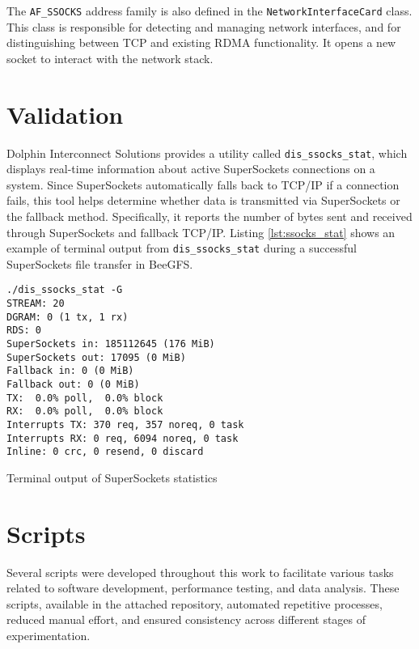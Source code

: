 The \texttt{AF\_SSOCKS} address family is also defined in the \texttt{NetworkInterfaceCard} class. This class is responsible for detecting and managing network interfaces, and for distinguishing between TCP and existing RDMA functionality. It opens a new socket to interact with the network stack.

\section{Validation}

Dolphin Interconnect Solutions provides a utility called \texttt{dis\_ssocks\_stat}, which displays real-time information about active SuperSockets connections on a system. Since SuperSockets automatically falls back to TCP/IP if a connection fails, this tool helps determine whether data is transmitted via SuperSockets or the fallback method. Specifically, it reports the number of bytes sent and received through SuperSockets and fallback TCP/IP. Listing \ref{lst:ssocks_stat} shows an example of terminal output from \texttt{dis\_ssocks\_stat} during a successful SuperSockets file transfer in BeeGFS.

\begin{listing}[H]
\begin{verbatim}
./dis_ssocks_stat -G
STREAM: 20
DGRAM: 0 (1 tx, 1 rx)
RDS: 0
SuperSockets in: 185112645 (176 MiB)
SuperSockets out: 17095 (0 MiB)
Fallback in: 0 (0 MiB)
Fallback out: 0 (0 MiB)
TX:  0.0% poll,  0.0% block
RX:  0.0% poll,  0.0% block
Interrupts TX: 370 req, 357 noreq, 0 task
Interrupts RX: 0 req, 6094 noreq, 0 task
Inline: 0 crc, 0 resend, 0 discard
\end{verbatim}
\caption{Terminal output of SuperSockets statistics}
\label{lst:ssocks_stat}
\end{listing}

\section{Scripts}

Several scripts were developed throughout this work to facilitate various tasks related to software development, performance testing, and data analysis. These scripts, available in the attached repository, automated repetitive processes, reduced manual effort, and ensured consistency across different stages of experimentation.

